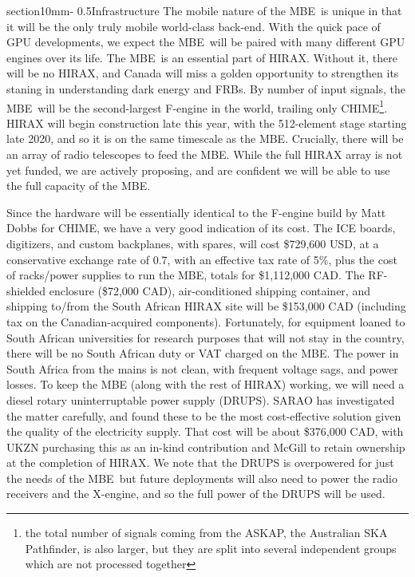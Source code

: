 \documentclass[letterpaper,11pt,preprint]{aastex}
\makeatletter
\newcommand{\mbe}{{\rm MBE}}
\renewcommand{\section}{\@startsection%
{section}{1}{0mm}{-\baselineskip}%
{0.5\baselineskip}{\normalfont\Large\bfseries}}%
\makeatother
\begin{document}
\section{Infrastructure}
The mobile nature of the \mbe\ is unique in that it will be the only
truly mobile world-class back-end.  With the quick pace of GPU
developments, we expect the \mbe\ will be paired with many different
GPU engines over its life.  The \mbe\ is an essential part of HIRAX.
Without it, there will be no HIRAX, and Canada will miss a golden
opportunity to strengthen its staning in understanding dark energy and
FRBs.  By number of input signals, the \mbe\ will be the
second-largest F-engine in the world, trailing only CHIME\footnote{the
  total number of signals coming from the ASKAP, the Australian SKA
  Pathfinder, is also larger, but they are split into several
  independent groups which are not processed together}.  HIRAX will
begin construction late this year, with the 512-element stage starting
late 2020, and so it is on the same timescale as the \mbe.  Crucially,
there will be an array of radio telescopes to feed the \mbe.  While
the full HIRAX array is not yet funded, we are actively proposing, and
are confident we will be able to use the full capacity of the \mbe. 

Since the hardware will be essentially identical to the F-engine build
by Matt Dobbs for CHIME, we have a very good indication of its cost.
The ICE boards, digitizers, and custom backplanes, with spares, will
cost \$729,600 USD, at a conservative exchange rate of 0.7, with an
effective tax rate of 5\%, plus the cost of racks/power supplies to
run the \mbe, totals for \$1,112,000 CAD.  The RF-shielded enclosure
(\$72,000 CAD), air-conditioned shipping container, and shipping
to/from the South African HIRAX site will be \$153,000 CAD (including
tax on the Canadian-acquired components).  Fortunately, for equipment
loaned to South African universities for research purposes that will
not stay in the country, there will be no South African duty or VAT
charged on the \mbe.  The power in South Africa from the mains is not
clean, with frequent voltage sags, and power losses.  To keep the \mbe
(along with the rest of HIRAX) working, we will need a diesel rotary
uninterruptable power supply (DRUPS).  SARAO has investigated the
matter carefully, and found these to be the most cost-effective
solution given the quality of the electricity supply.  That cost
will be about \$376,000 CAD, with UKZN purchasing this as an in-kind
contribution and McGill to retain ownership at the completion of
HIRAX.  We note that the DRUPS is overpowered for just the needs of the
\mbe\, but future deployments will also need to power the radio
receivers and the X-engine, and so the full power of the DRUPS will be used.
\end{document}
